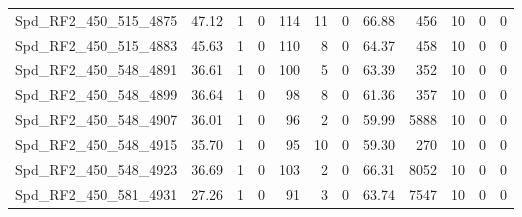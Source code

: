 \begin{longtable}[c]{@{}lrrrrrrrrrrr@{}}
Spd\_RF2\_450\_515\_4875     & 47.12                  & 1                       & 0                       & 114                    & 11                      & 0                       & 66.88                   & 456                      & 10                       & 0                        & 0                        \\
Spd\_RF2\_450\_515\_4883     & 45.63                  & 1                       & 0                       & 110                    & 8                       & 0                       & 64.37                   & 458                      & 10                       & 0                        & 0                        \\
Spd\_RF2\_450\_548\_4891     & 36.61                  & 1                       & 0                       & 100                    & 5                       & 0                       & 63.39                   & 352                      & 10                       & 0                        & 0                        \\
Spd\_RF2\_450\_548\_4899     & 36.64                  & 1                       & 0                       & 98                     & 8                       & 0                       & 61.36                   & 357                      & 10                       & 0                        & 0                        \\
Spd\_RF2\_450\_548\_4907     & 36.01                  & 1                       & 0                       & 96                     & 2                       & 0                       & 59.99                   & 5888                     & 10                       & 0                        & 0                        \\
Spd\_RF2\_450\_548\_4915     & 35.70                  & 1                       & 0                       & 95                     & 10                      & 0                       & 59.30                   & 270                      & 10                       & 0                        & 0                        \\
Spd\_RF2\_450\_548\_4923     & 36.69                  & 1                       & 0                       & 103                    & 2                       & 0                       & 66.31                   & 8052                     & 10                       & 0                        & 0                        \\
Spd\_RF2\_450\_581\_4931     & 27.26                  & 1                       & 0                       & 91                     & 3                       & 0                       & 63.74                   & 7547                     & 10                       & 0                        & 0                        \\

\end{longtable}
